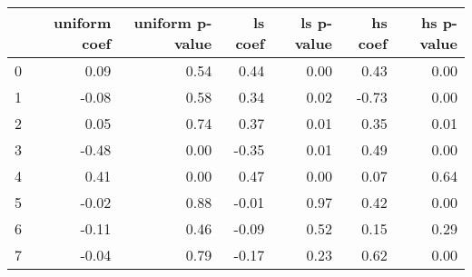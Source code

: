 \begin{tabular}{lrrrrrr}
\toprule
 & uniform coef & uniform p-value & ls coef & ls p-value & hs coef & hs p-value \\
\midrule
0 & 0.09 & 0.54 & 0.44 & 0.00 & 0.43 & 0.00 \\
1 & -0.08 & 0.58 & 0.34 & 0.02 & -0.73 & 0.00 \\
2 & 0.05 & 0.74 & 0.37 & 0.01 & 0.35 & 0.01 \\
3 & -0.48 & 0.00 & -0.35 & 0.01 & 0.49 & 0.00 \\
4 & 0.41 & 0.00 & 0.47 & 0.00 & 0.07 & 0.64 \\
5 & -0.02 & 0.88 & -0.01 & 0.97 & 0.42 & 0.00 \\
6 & -0.11 & 0.46 & -0.09 & 0.52 & 0.15 & 0.29 \\
7 & -0.04 & 0.79 & -0.17 & 0.23 & 0.62 & 0.00 \\
\bottomrule
\end{tabular}
